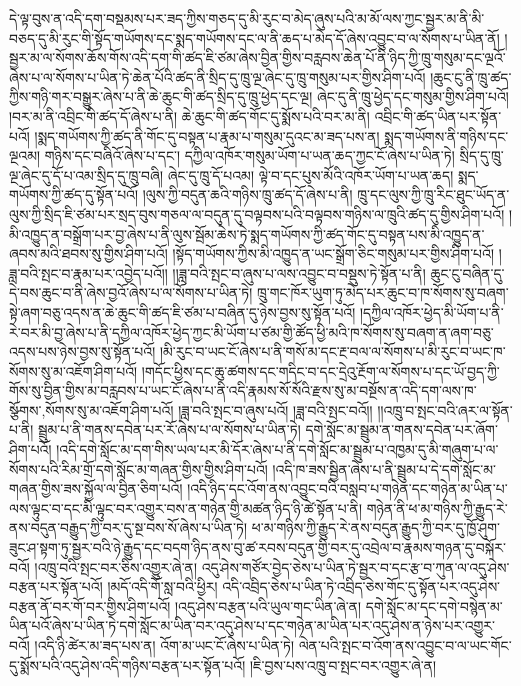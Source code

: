 དེ་ལྟ་བུས་ན་འདི་དག་བསྡམས་པར་ཟད་ཀྱིས་གཅད་དུ་མི་རུང་བ་མེད་ཞུས་པའི་མ་མོ་ལས་ཀྱང་སྦྱར་མ་ནི་མི་བཅད་དུ་མི་རུང་གི་སྟོད་གཡོགས་དང་སྨད་གཡོགས་དང་ལ་ནི་ཆད་པ་མེད་དོ་ཞེས་འབྱུང་བ་ལ་སོགས་པ་ཡིན་ནོ། །སྦྱར་མ་ལ་སོགས་ཆོས་གོས་འདི་དག་གི་ཚད་ཇི་ཙམ་ཞེས་བྱིན་གྱིས་བརླབས་ཆེན་པོ་ནི་ཉིད་ཀྱི་ཁྲུ་གསུམ་དང་ལྔའོ་ཞེས་པ་ལ་སོགས་པ་ཡིན་ཏེ་ཆེན་པོའི་ཚད་ནི་སྲིད་དུ་ཁྲུ་ལྔ་ཞེང་དུ་ཁྲུ་གསུམ་པར་གྱིས་ཤིག་པའོ། །ཆུང་ངུ་ནི་ཁྲུ་ཚད་ཀྱིས་གཉི་གར་བསྒྱུར་ཞེས་པ་ནི་ཆེ་ཆུང་གི་ཚད་སྲིད་དུ་ཁྲུ་ཕྱེད་དང་ལྔ། ཞེང་དུ་ནི་ཁྲུ་ཕྱེད་དང་གསུམ་གྱིས་ཤིག་པའོ། །བར་མ་ནི་འབྲིང་གི་ཚད་དོ་ཞེས་པ་ནི། ཆེ་ཆུང་གི་ཚད་གོང་དུ་སྨོས་པའི་བར་མ་ནི། འབྲིང་གི་ཚད་ཡིན་པར་སྟོན་པའོ། །སྨད་གཡོགས་ཀྱི་ཚད་ནི་གོང་དུ་བསྟན་པ་རྣམ་པ་གསུམ་དུའང་མ་ཟད་པས་ན། སྨད་གཡོགས་ནི་གཉིས་དང་ལྔའམ། གཉིས་དང་བཞིའོ་ཞེས་པ་དང་། དཀྱིལ་འཁོར་གསུམ་ཡོག་པ་ཡན་ཆད་ཀྱང་ངོ་ཞེས་པ་ཡིན་ཏེ། སྲིད་དུ་ཁྲུ་ལྔ་ཞེང་དུ་དོ་པ་འམ་སྲིད་དུ་ཁྲུ་བཞི། ཞེང་དུ་ཁྲུ་དོ་པའམ། ལྟེ་བ་དང་པུས་མོའི་འཁོར་ཡོག་པ་ཡན་ཆད། སྨད་གཡོགས་ཀྱི་ཚད་དུ་སྟོན་པའོ། །ལུས་ཀྱི་བདུན་ཆའི་གཉིས་ཁྲུ་ཚད་དོ་ཞེས་པ་ནི། ཁྲུ་དང་ལུས་ཀྱི་ཁྲུ་རིང་ཐུང་ཡོད་ན་ལུས་ཀྱི་སྲིད་ཇི་ཙམ་པར་སྲད་བུས་གཅལ་ལ་བདུན་དུ་བལྟབས་པའི་བལྟབས་གཉིས་ལ་ཁྲུའི་ཚད་དུ་གྱིས་ཤིག་པའོ། །མི་འཁྱུད་ན་བསྒྲོག་པར་བྱ་ཞེས་པ་ནི་ལུས་སྦོམ་ཆེས་ཏེ་སྨད་གཡོགས་ཀྱི་ཚད་གོང་དུ་བསྟན་པས་མི་འཁྱུད་ན་ཞབས་མའི་ཐབས་སུ་གྱིས་ཤིག་པའོ། །སྟོད་གཡོགས་ཀྱིས་མི་འཁྱུད་ན་ཡང་སྒྲོག་ཅིང་གསུམ་པར་གྱིས་ཤིག་པའོ། །ཟླ་བའི་སྤང་བ་རྣམ་པར་འབྱེད་པའོ།། །།ཟླ་བའི་སྤང་བ་ཞུས་པ་ལས་འབྱུང་བ་བསྡུས་ཏེ་སྟོན་པ་ནི། ཆུང་ངུ་བཞིན་དུ་དེ་བས་ཆུང་བ་ནི་ཞེས་བྱའོ་ཞེས་པ་ལ་སོགས་པ་ཡིན་ཏེ། ཁྲུ་གང་ཁོར་ཡུག་ཏུ་མེད་པར་ཆུང་བ་ཁ་སོགས་སུ་བཞག་སྟེ་ཞག་བཅུ་འདས་ན་ཆེ་ཆུང་གི་ཚད་ཇི་ཙམ་པ་བཞིན་དུ་ཉེས་བྱས་སུ་སྟོན་པའོ། །དཀྱིལ་འཁོར་ཕྱེད་མི་ཡོག་པ་ནི་རེ་བར་མི་བྱ་ཞེས་པ་ནི་དཀྱིལ་འཁོར་ཕྱེད་ཀྱང་མི་ཡོག་པ་ཙམ་གྱི་ཚོད་ཕྱི་མའི་ཁ་སོགས་སུ་བཞག་ན་ཞག་བཅུ་འདས་པས་ཉེས་བྱས་སུ་སྟོན་པའོ། །མི་རུང་བ་ཡང་ངོ་ཞེས་པ་ནི་གསོ་མ་དང་རྔ་བལ་ལ་སོགས་པ་མི་རུང་བ་ཡང་ཁ་སོགས་སུ་མ་འཇོག་ཤིག་པའོ། །གདོང་ཕྱིས་དང་ཆུ་ཚགས་དང་གདིང་བ་དང་དྲེའུ་རྔོག་ལ་སོགས་པ་དང་ཡོ་བྱད་ཀྱི་གོས་སུ་བྱིན་གྱིས་མ་བརླབས་པ་ཡང་ངོ་ཞེས་པ་ནི་འདི་རྣམས་སོ་སོའི་རྫས་སུ་མ་བསྔོས་ན་འདི་དག་ལས་ཁ་{སྩོགས་,སོགས་}སུ་མ་འཇོག་ཤིག་པའོ། །ཟླ་བའི་སྤང་བ་ཞུས་པའོ། །ཟླ་བའི་སྤང་བའོ།། །།འཁྲུ་བ་སྤང་བའི་ཞར་ལ་སྟོན་པ་ནི། སྦྲུམ་པ་ནི་གནས་དབེན་པར་རོ་ཞེས་པ་ལ་སོགས་པ་ཡིན་ཏེ། དགེ་སློང་མ་སྦྲུམ་ན་གནས་དབེན་པར་ཞོག་ཤིག་པའོ། །འདི་དགེ་སློང་མ་དག་གིས་ཡལ་པར་མི་དོར་ཞེས་པ་ནི་དགེ་སློང་མ་སྦྲུམ་པ་འཁྱམ་དུ་མི་གཞུག་པ་ལ་སོགས་པའི་རིམ་གྲོ་དགེ་སློང་མ་གཞན་གྱིས་གྱིས་ཤིག་པའོ། །འདི་ཁ་ཟས་སྦྱིན་ཞེས་པ་ནི་སྦྲུམ་པ་དེ་དགེ་སློང་མ་གཞན་གྱིས་ཟས་སྐྱོལ་ལ་བྱིན་ཅིག་པའོ། །འདི་ཉིད་དང་འོག་ནས་འབྱུང་བའི་བསླབ་པ་གཉེན་དང་གཉེན་མ་ཡིན་པ་ལས་ལྟུང་བ་དང་མི་ལྟུང་བར་འགྱུར་བས་ན་གཉེན་གྱི་མཚན་ཉིད་ཉི་ཚེ་སྟོན་པ་ནི། གཉེན་ནི་ཕ་མ་གཉིས་ཀྱི་རྒྱུད་རེ་ནས་བདུན་བརྒྱུད་ཀྱི་བར་དུ་སྔ་བས་སོ་ཞེས་པ་ཡིན་ཏེ། ཕ་མ་གཉིས་ཀྱི་རྒྱུད་རེ་ནས་བདུན་རྒྱུད་ཀྱི་བར་དུ་ཁྱོ་ཤུག་ཟུང་ཤ་སྟག་ཏུ་སྦྱར་བའི་ཉེ་རྒྱུད་དང་བདག་ཉིད་ནས་བུ་ཚ་རབས་བདུན་གྱི་བར་དུ་འབྲེལ་བ་རྣམས་གཉན་དུ་བསྐོར་བའོ། །འཁྲུ་བའི་སྤང་བར་ཅིས་འགྱུར་ཞེ་ན། འདུ་ཤེས་གཙོར་བྱེད་ཅེས་པ་ཡིན་ཏེ་སྦྱར་བ་དང་རྩ་བ་ཀུན་ལ་འདུ་ཤེས་བརྩན་པར་སྟོན་པའོ། །མདོ་འདི་གོ་སླ་བའི་ཕྱིར། འདི་འབྲིད་ཅེས་པ་ཡིན་ཏེ་འབྲིད་ཅེས་གོང་དུ་སྟོན་པར་འདུ་ཤེས་བརྩན་ནོ་བར་གོ་བར་གྱིས་ཤིག་པའོ། །འདུ་ཤེས་བརྩན་པའི་ཡུལ་གང་ཡིན་ཞེ་ན། དགེ་སློང་མ་དང་དགེ་བསྙེན་མ་ཡིན་པའོ་ཞེས་པ་ཡིན་ཏེ་དགེ་སློང་མ་ཡིན་བར་འདུ་ཤེས་པ་དང་གཉེན་མ་ཡིན་པར་འདུ་ཤེས་ན་ཉེས་པར་འགྱུར་བའོ། །འདི་ཉི་ཚེར་མ་ཟད་པས་ན། འོག་མ་ཡང་ངོ་ཞེས་པ་ཡིན་ཏེ། ལེན་པའི་སྤང་བ་འོག་ནས་འབྱུང་བ་ལ་ཡང་གོང་དུ་སྨོས་པའི་འདུ་ཤེས་འདི་གཉིས་བརྩན་པར་སྟོན་པའོ། །ཇི་བྱས་པས་འཁྲུ་བ་སྤང་བར་འགྱུར་ཞེ་ན། 